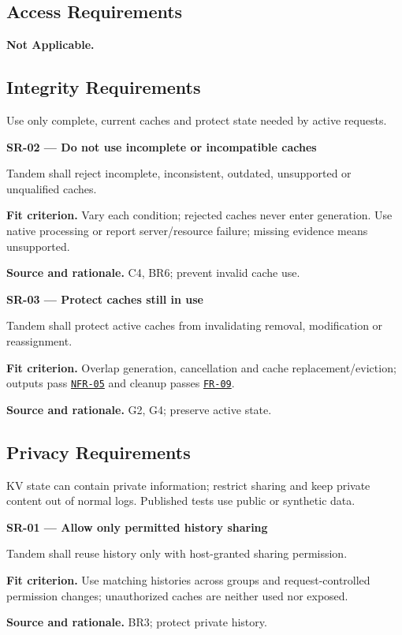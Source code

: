 \documentclass[12pt]{article}
\begin{document}
\subsection{Access Requirements}
\label{sec:security}
\textbf{Not Applicable.}

\subsection{Integrity Requirements}
Use only complete, current caches and protect state needed by active requests.

\par\medskip\noindent{}\label{req:SR-02}
\textbf{SR-02 --- Do not use incomplete or incompatible caches}\par
Tandem shall reject incomplete, inconsistent, outdated, unsupported or unqualified caches.\par
\textbf{Fit criterion.} Vary each condition; rejected caches never enter generation. Use native processing or report server/resource failure; missing evidence means unsupported.\par
\textbf{Source and rationale.} C4, BR6; prevent invalid cache use.

\par\medskip\noindent{}\label{req:SR-03}
\textbf{SR-03 --- Protect caches still in use}\par
Tandem shall protect active caches from invalidating removal, modification or reassignment.\par
\textbf{Fit criterion.} Overlap generation, cancellation and cache replacement/eviction; outputs pass \hyperref[req:NFR-05]{\texttt{NFR-05}} and cleanup passes \hyperref[req:FR-09]{\texttt{FR-09}}.\par
\textbf{Source and rationale.} G2, G4; preserve active state.

\subsection{Privacy Requirements}
KV state can contain private information; restrict sharing and keep private
content out of normal logs. Published tests use public or synthetic data.

\par\medskip\noindent{}\label{req:SR-01}
\textbf{SR-01 --- Allow only permitted history sharing}\par
Tandem shall reuse history only with host-granted sharing permission.\par
\textbf{Fit criterion.} Use matching histories across groups and request-controlled permission changes; unauthorized caches are neither used nor exposed.\par
\textbf{Source and rationale.} BR3; protect private history.
\end{document}
